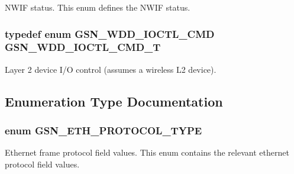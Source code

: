 NWIF status. This enum defines the NWIF status. 

\hypertarget{a00670_ga0c5055a50e14741ff0accb7d8d5bf039}{
\subsubsection[{GSN\_\-WDD\_\-IOCTL\_\-CMD\_\-T}]{\setlength{\rightskip}{0pt plus 5cm}typedef enum {\bf GSN\_\-WDD\_\-IOCTL\_\-CMD}  {\bf GSN\_\-WDD\_\-IOCTL\_\-CMD\_\-T}}}
\label{a00670_ga0c5055a50e14741ff0accb7d8d5bf039}


Layer 2 device I/O control (assumes a wireless L2 device). 



\subsection{Enumeration Type Documentation}
\hypertarget{a00670_ga5be81e41aa75406c2f3b778aa073e052}{
\subsubsection[{GSN\_\-ETH\_\-PROTOCOL\_\-TYPE}]{\setlength{\rightskip}{0pt plus 5cm}enum {\bf GSN\_\-ETH\_\-PROTOCOL\_\-TYPE}}}
\label{a00670_ga5be81e41aa75406c2f3b778aa073e052}


Ethernet frame protocol field values. This enum contains the relevant ethernet protocol field values. 

